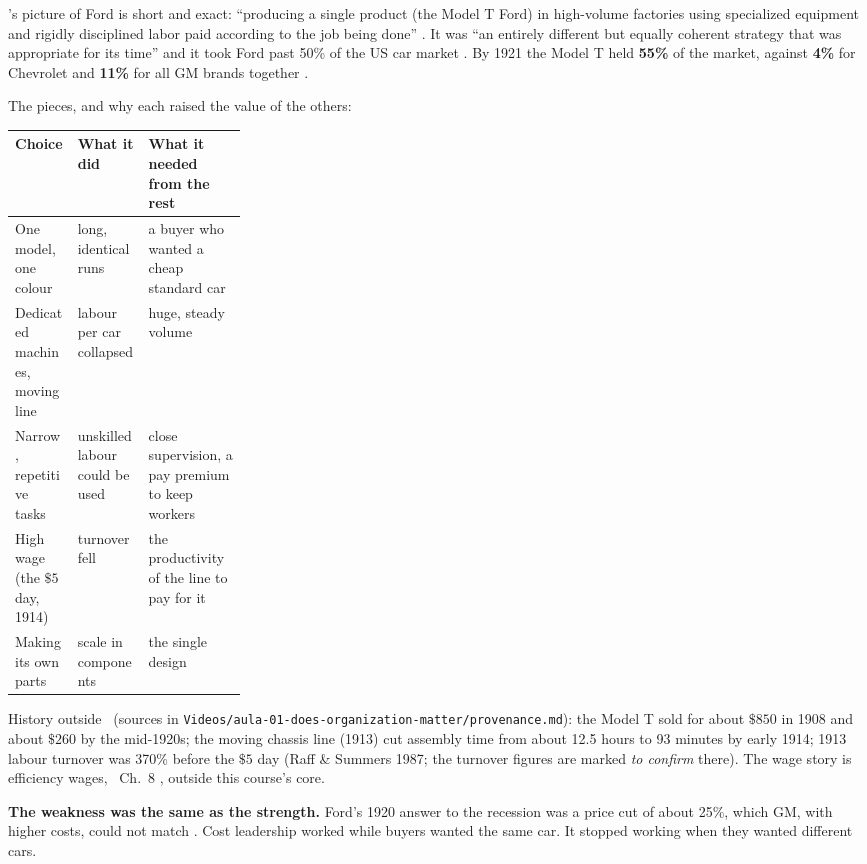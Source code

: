 \MR's picture of Ford is short and exact: ``producing a single product (the Model T Ford) in
high-volume factories using specialized equipment and rigidly disciplined labor paid according to
the job being done'' . It was ``an entirely different but equally coherent strategy that
was appropriate for its time'' and it took Ford past 50\% of the US car market . By 1921
the Model T held \textbf{55\%} of the market, against \textbf{4\%} for Chevrolet and \textbf{11\%}
for all GM brands together .

The pieces, and why each raised the value of the others:

\begin{center}
\small
\begin{tabularx}{\linewidth}{@{}>{\raggedright\arraybackslash}p{0.27\linewidth}
  >{\raggedright\arraybackslash}X >{\raggedright\arraybackslash}X@{}}
\toprule
Choice & What it did & What it needed from the rest \\
\midrule
One model, one colour & long, identical runs & a buyer who wanted a cheap standard car \\
Dedicated machines, moving line & labour per car collapsed & huge, steady volume \\
Narrow, repetitive tasks & unskilled labour could be used & close supervision, a pay premium to
  keep workers \\
High wage (the $\$5$ day, 1914) & turnover fell & the productivity of the line to pay for it \\
Making its own parts & scale in components & the single design \\
\bottomrule
\end{tabularx}
\end{center}

History outside \MR\ (sources in
\texttt{Videos/\allowbreak aula-01-does-organization-matter/\allowbreak provenance.md}): the Model T sold for about
$\$850$ in 1908 and about $\$260$ by the mid-1920s; the moving chassis line (1913) cut assembly
time from about 12.5 hours to 93 minutes by early 1914; 1913 labour turnover was 370\% before the
$\$5$ day (Raff \& Summers 1987; the turnover figures are marked \emph{to confirm} there). The wage
story is efficiency wages, \MR\ Ch.~8 , outside this course's core.

\textbf{The weakness was the same as the strength.} Ford's 1920 answer to the recession was a price
cut of about 25\%, which GM, with higher costs, could not match . Cost leadership worked
while buyers wanted the same car. It stopped working when they wanted different cars.

